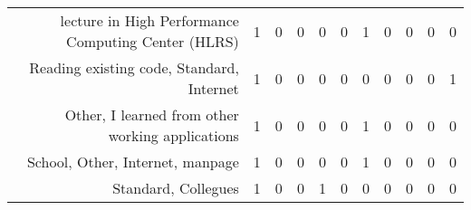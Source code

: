 {\begin{landscape}
\begin{longtable}[htb]{r|c|c|c|c|c|c|c|c|c|c}
{lecture in High Performance Computing Center (HLRS)} & 1 & 0 & 0 & 0 & 0 & 1 & 0 & 0 & 0 & 0 \\%
{Reading existing code, Standard, Internet} & 1 & 0 & 0 & 0 & 0 & 0 & 0 & 0 & 0 & 1 \\%
{Other, I learned from other working applications} & 1 & 0 & 0 & 0 & 0 & 1 & 0 & 0 & 0 & 0 \\%
{School, Other, Internet, manpage} & 1 & 0 & 0 & 0 & 0 & 1 & 0 & 0 & 0 & 0 \\%
{Standard, Collegues} & 1 & 0 & 0 & 1 & 0 & 0 & 0 & 0 & 0 & 0 \\%
\hline%
\end{longtable}%
\end{landscape}}%
\clearpage%

